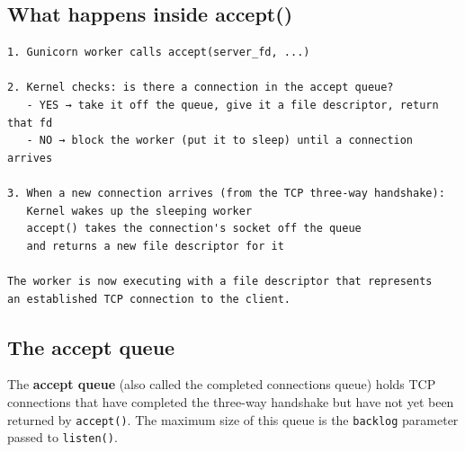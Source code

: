 \subsection*{What happens inside accept()}\label{30-kernel-application-handoff:what-happens-inside-accept}

\begin{outputbox}[short]
\begin{Verbatim}[fontsize=\codesize, breaklines, breakanywhere, breaksymbolleft={\tiny\textcolor{muted}{$\hookrightarrow$}}]
1. Gunicorn worker calls accept(server_fd, ...)

2. Kernel checks: is there a connection in the accept queue?
   - YES → take it off the queue, give it a file descriptor, return that fd
   - NO → block the worker (put it to sleep) until a connection arrives

3. When a new connection arrives (from the TCP three-way handshake):
   Kernel wakes up the sleeping worker
   accept() takes the connection's socket off the queue
   and returns a new file descriptor for it

The worker is now executing with a file descriptor that represents
an established TCP connection to the client.
\end{Verbatim}
\end{outputbox}

\subsection*{The accept queue}\label{30-kernel-application-handoff:the-accept-queue}

The \textbf{accept queue} (also called the completed connections queue) holds TCP connections that have completed the three-way handshake but have not yet been returned by \texttt{accept()}. The maximum size of this queue is the \texttt{backlog} parameter passed to \texttt{listen()}.

\begin{codebox}[short]

\begin{Shaded}
\begin{Highlighting}[]
\NormalTok{)   }
\end{Highlighting}
\end{Shaded}

\end{codebox}

